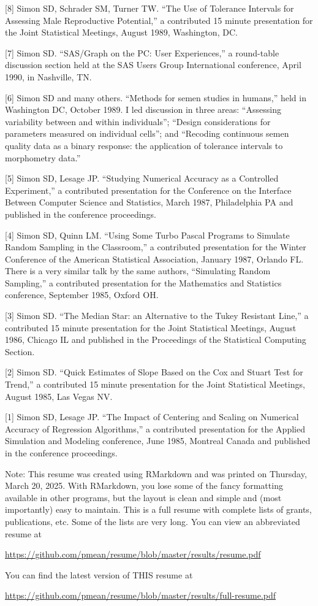 \documentclass[
  12pt,
]{article}
\begin{document}
{[}8{]} Simon SD, Schrader SM, Turner TW. ``The Use of Tolerance
Intervals for Assessing Male Reproductive Potential,'' a contributed 15
minute presentation for the Joint Statistical Meetings, August 1989,
Washington, DC.

{[}7{]} Simon SD. ``SAS/Graph on the PC: User Experiences,'' a
round-table discussion section held at the SAS Users Group International
conference, April 1990, in Nashville, TN.

{[}6{]} Simon SD and many others. ``Methods for semen studies in
humans,'' held in Washington DC, October 1989. I led discussion in three
areas: ``Assessing variability between and within individuals'';
``Design considerations for parameters measured on individual cells'';
and ``Recoding continuous semen quality data as a binary response: the
application of tolerance intervals to morphometry data.''

{[}5{]} Simon SD, Lesage JP. ``Studying Numerical Accuracy as a
Controlled Experiment,'' a contributed presentation for the Conference
on the Interface Between Computer Science and Statistics, March 1987,
Philadelphia PA and published in the conference proceedings.

{[}4{]} Simon SD, Quinn LM. ``Using Some Turbo Pascal Programs to
Simulate Random Sampling in the Classroom,'' a contributed presentation
for the Winter Conference of the American Statistical Association,
January 1987, Orlando FL. There is a very similar talk by the same
authors, ``Simulating Random Sampling,'' a contributed presentation for
the Mathematics and Statistics conference, September 1985, Oxford OH.

{[}3{]} Simon SD. ``The Median Star: an Alternative to the Tukey
Resistant Line,'' a contributed 15 minute presentation for the Joint
Statistical Meetings, August 1986, Chicago IL and published in the
Proceedings of the Statistical Computing Section.

{[}2{]} Simon SD. ``Quick Estimates of Slope Based on the Cox and Stuart
Test for Trend,'' a contributed 15 minute presentation for the Joint
Statistical Meetings, August 1985, Las Vegas NV.

{[}1{]} Simon SD, Lesage JP. ``The Impact of Centering and Scaling on
Numerical Accuracy of Regression Algorithms,'' a contributed
presentation for the Applied Simulation and Modeling conference, June
1985, Montreal Canada and published in the conference proceedings.

Note: This resume was created using RMarkdown and was printed on
Thursday, March 20, 2025. With RMarkdown, you lose some of the fancy
formatting available in other programs, but the layout is clean and
simple and (most importantly) easy to maintain. This is a full resume
with complete lists of grants, publications, etc. Some of the lists are
very long. You can view an abbreviated resume at

\url{https://github.com/pmean/resume/blob/master/results/resume.pdf}

You can find the latest version of THIS resume at

\url{https://github.com/pmean/resume/blob/master/results/full-resume.pdf}
\end{document}
